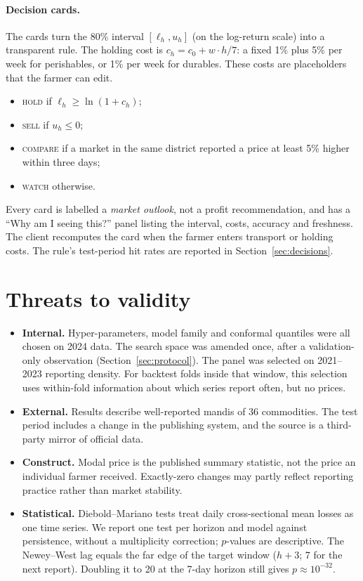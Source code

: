 \paragraph{Decision cards.}
The cards turn the 80\% interval $[\ell_h,u_h]$ (on the log-return scale) into a transparent rule.
The holding cost is $c_h = c_0 + w\cdot h/7$: a fixed 1\% plus 5\% per week for perishables, or 1\% per week for durables.
These costs are placeholders that the farmer can edit.
\begin{itemize}
  \item \textsc{hold} if $\ell_h\ge\ln(1+c_h)$;
  \item \textsc{sell} if $u_h\le 0$;
  \item \textsc{compare} if a market in the same district reported a price at least 5\% higher within three days;
  \item \textsc{watch} otherwise.
\end{itemize}
Every card is labelled a \emph{market outlook}, not a profit recommendation, and has a ``Why am I seeing this?'' panel listing the interval, costs, accuracy and freshness.
The client recomputes the card when the farmer enters transport or holding costs.
The rule's test-period hit rates are reported in Section~\ref{sec:decisions}.

\section{Threats to validity}\label{sec:threats}
\begin{itemize}
  \item \textbf{Internal.}
    Hyper-parameters, model family and conformal quantiles were all chosen on 2024 data.
    The search space was amended once, after a validation-only observation (Section~\ref{sec:protocol}).
    The panel was selected on 2021--2023 reporting density.
    For backtest folds inside that window, this selection uses within-fold information about which series report often, but no prices.
  \item \textbf{External.}
    Results describe well-reported mandis of 36 commodities.
    The test period includes a change in the publishing system, and the source is a third-party mirror of official data.
  \item \textbf{Construct.}
    Modal price is the published summary statistic, not the price an individual farmer received.
    Exactly-zero changes may partly reflect reporting practice rather than market stability.
  \item \textbf{Statistical.}
    Diebold--Mariano tests treat daily cross-sectional mean losses as one time series.
    We report one test per horizon and model against persistence, without a multiplicity correction; $p$-values are descriptive.
    The Newey--West lag equals the far edge of the target window ($h+3$; 7 for the next report). Doubling it to 20 at the 7-day horizon still gives $p\approx10^{-32}$.
\end{itemize}

